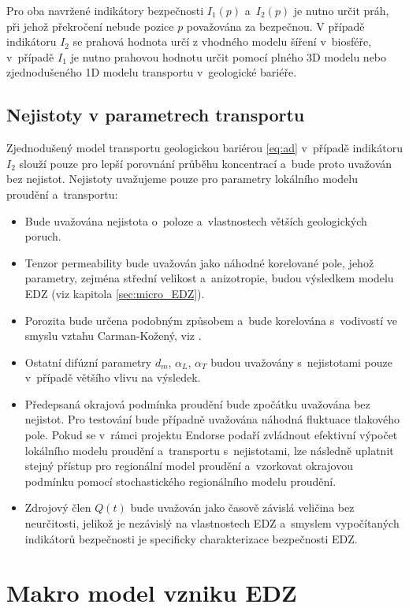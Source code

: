 \documentclass{article}
\begin{document}
Pro oba navržené indikátory bezpečnosti $I_1(p)$ a~$I_2(p)$ je nutno určit práh, při jehož překročení nebude pozice $p$ považována za bezpečnou. V případě indikátoru $I_2$ se prahová hodnota určí z vhodného modelu šíření  v~biosféře, v~případě $I_1$ je nutno prahovou hodnotu určit pomocí plného 3D modelu nebo zjednodušeného 1D modelu transportu v~geologické bariéře.



\subsection{Nejistoty v parametrech transportu}
\label{sec:nejistoty}
Zjednodušený model transportu geologickou bariérou \eqref{eq:ad} v~případě indikátoru $I_2$ slouží pouze pro lepší porovnání průběhu koncentrací a~bude proto uvažován bez nejistot. Nejistoty uvažujeme pouze pro parametry lokálního modelu proudění a~transportu:
\begin{itemize}
 \item Bude uvažována nejistota o~poloze a~vlastnostech větších geologických poruch.
 \item Tenzor permeability bude uvažován jako náhodné korelované pole, jehož parametry, zejména střední velikost a~anizotropie, budou 
 výsledkem modelu EDZ (viz kapitola \ref{sec:micro_EDZ}).
 \item Porozita bude určena podobným způsobem a~bude korelována s~vodivostí ve smyslu vztahu Carman-Kožený, viz \cite{Carrier2003}.
 \item Ostatní difúzní parametry $d_m$, $\alpha_L$, $\alpha_T$ budou uvažovány s~nejistotami pouze v~případě většího vlivu na výsledek.
 \item Předepsaná okrajová podmínka proudění bude zpočátku uvažována bez nejistot. Pro testování bude případně uvažována náhodná fluktuace tlakového pole. Pokud se v~rámci projektu Endorse podaří zvládnout efektivní výpočet lokálního modelu proudění a~transportu s~nejistotami, lze následně uplatnit stejný přístup pro regionální model proudění a~vzorkovat okrajovou podmínku pomocí stochastického regionálního modelu proudění.
 \item Zdrojový člen $Q(t)$ bude uvažován jako časově závislá veličina bez neurčitosti, jelikož 
 je nezávislý na vlastnostech EDZ a~smyslem vypočítaných indikátorů bezpečnosti je specificky charakterizace bezpečnosti EDZ.
\end{itemize}

\section{Makro model vzniku EDZ}
\label{sec:model_EDZ}
\end{document}
